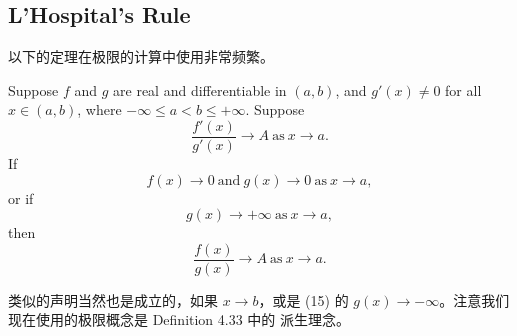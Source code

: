 \documentclass[../poma-notes.tex]{subfiles}
\begin{document}
\newpage
\subsection*{L'Hospital's Rule}

以下的定理在极限的计算中使用非常频繁。

\begin{theorem}
  Suppose $f$ and $g$ are real and differentiable in $(a, b)$, and $g'(x) \ne 0$ for all $x \in (a,b)$, where
  $-\infty \le a < b \le +\infty$. Suppose
  \begin{equation}
    \frac{f'(x)}{g'(x)} \to A \ \text{as} \ x \to a.
  \end{equation}
  If
  \begin{equation}
    f(x) \to 0 \ \text{and} \ g(x) \to 0 \ \text{as} \ x \to a,
  \end{equation}
  or if
  \begin{equation}
    g(x) \to +\infty \ \text{as} \ x \to a,
  \end{equation}
  then
  \begin{equation}
    \frac{f(x)}{g(x)} \to A \ \text{as} \ x \to a.
  \end{equation}
\end{theorem}

类似的声明当然也是成立的，如果 $x \to b$，或是 (15) 的 $g(x) \to -\infty$。注意我们现在使用的极限概念是 Definition 4.33 中的
派生理念。
\end{document}
